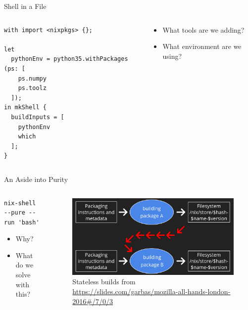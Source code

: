 \documentclass[bigger,unknownkeysallowed,aspectratio=169,colorblocks]{beamer}
\begin{document}
\begin{frame}[label={sec:org4fe563a},fragile]{Shell in a File}
 \begin{columns}
\begin{column}{0.6\columnwidth}
\begin{verbatim}
with import <nixpkgs> {};

let
  pythonEnv = python35.withPackages (ps: [
    ps.numpy
    ps.toolz
  ]);
in mkShell {
  buildInputs = [
    pythonEnv
    which
  ];
}
\end{verbatim}
\end{column}
\begin{column}{0.4\columnwidth}
\begin{itemize}
\item What \alert{tools} are we adding?
\item What \alert{environment} are we using?
\end{itemize}
\end{column}
\end{columns}
\end{frame}
\begin{frame}[label={sec:org9324ad5},fragile]{An Aside into Purity}
 \begin{columns}
\begin{column}{0.4\columnwidth}
\begin{verbatim}
nix-shell --pure --run 'bash'
\end{verbatim}
\begin{itemize}
\item Why?
\item What do we solve with this?
\end{itemize}
\end{column}

\begin{column}{0.6\columnwidth}
\begin{figure}[htbp]
\centering
\includegraphics[width=.9\linewidth]{images/A_screenshot/2020-05-22_23-57-17_screenshot.png}
\caption{Stateless builds from \url{https://slides.com/garbas/mozilla-all-hands-london-2016\#/7/0/3}}
\end{figure}
\end{column}
\end{columns}
\end{frame}
\end{document}
